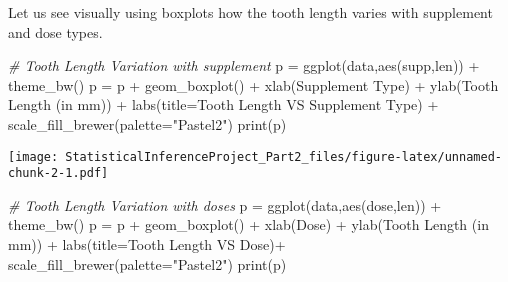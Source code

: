 \documentclass[
]{article}
\newenvironment{Shaded}{\begin{snugshade}}{\end{snugshade}}
\newcommand{\AttributeTok}[1]{\textcolor[rgb]{0.77,0.63,0.00}{#1}}
\newcommand{\CommentTok}[1]{\textcolor[rgb]{0.56,0.35,0.01}{\textit{#1}}}
\newcommand{\FunctionTok}[1]{\textcolor[rgb]{0.00,0.00,0.00}{#1}}
\newcommand{\NormalTok}[1]{#1}
\newcommand{\OtherTok}[1]{\textcolor[rgb]{0.56,0.35,0.01}{#1}}
\newcommand{\SpecialCharTok}[1]{\textcolor[rgb]{0.00,0.00,0.00}{#1}}
\newcommand{\StringTok}[1]{\textcolor[rgb]{0.31,0.60,0.02}{#1}}
\begin{document}
Let us see visually using boxplots how the tooth length varies with
supplement and dose types.

\begin{Shaded}
\begin{Highlighting}[]
\CommentTok{\# Tooth Length Variation with supplement}
\NormalTok{p }\OtherTok{=} \FunctionTok{ggplot}\NormalTok{(data,}\FunctionTok{aes}\NormalTok{(supp,len)) }\SpecialCharTok{+} \FunctionTok{theme\_bw}\NormalTok{() }
\NormalTok{p }\OtherTok{=}\NormalTok{ p }\SpecialCharTok{+} \FunctionTok{geom\_boxplot}\NormalTok{() }\SpecialCharTok{+} \FunctionTok{xlab}\NormalTok{(}\StringTok{\textquotesingle{}Supplement Type\textquotesingle{}}\NormalTok{) }\SpecialCharTok{+} \FunctionTok{ylab}\NormalTok{(}\StringTok{\textquotesingle{}Tooth Length (in mm)\textquotesingle{}}\NormalTok{) }\SpecialCharTok{+} 
  \FunctionTok{labs}\NormalTok{(}\AttributeTok{title=}\StringTok{\textquotesingle{}Tooth Length VS Supplement Type\textquotesingle{}}\NormalTok{) }\SpecialCharTok{+}
  \FunctionTok{scale\_fill\_brewer}\NormalTok{(}\AttributeTok{palette=}\StringTok{"Pastel2"}\NormalTok{)  }
\FunctionTok{print}\NormalTok{(p)}
\end{Highlighting}
\end{Shaded}

\texttt{[image: StatisticalInferenceProject\_Part2\_files/figure-latex/unnamed-chunk-2-1.pdf]}

\begin{Shaded}
\begin{Highlighting}[]
\CommentTok{\# Tooth Length Variation with doses}
\NormalTok{p }\OtherTok{=} \FunctionTok{ggplot}\NormalTok{(data,}\FunctionTok{aes}\NormalTok{(dose,len)) }\SpecialCharTok{+} \FunctionTok{theme\_bw}\NormalTok{() }
\NormalTok{p }\OtherTok{=}\NormalTok{ p }\SpecialCharTok{+} \FunctionTok{geom\_boxplot}\NormalTok{() }\SpecialCharTok{+} \FunctionTok{xlab}\NormalTok{(}\StringTok{\textquotesingle{}Dose\textquotesingle{}}\NormalTok{) }\SpecialCharTok{+} \FunctionTok{ylab}\NormalTok{(}\StringTok{\textquotesingle{}Tooth Length (in mm)\textquotesingle{}}\NormalTok{) }\SpecialCharTok{+} 
  \FunctionTok{labs}\NormalTok{(}\AttributeTok{title=}\StringTok{\textquotesingle{}Tooth Length VS Dose\textquotesingle{}}\NormalTok{)}\SpecialCharTok{+} 
  \FunctionTok{scale\_fill\_brewer}\NormalTok{(}\AttributeTok{palette=}\StringTok{"Pastel2"}\NormalTok{) }
\FunctionTok{print}\NormalTok{(p)}
\end{Highlighting}
\end{Shaded}
\end{document}
